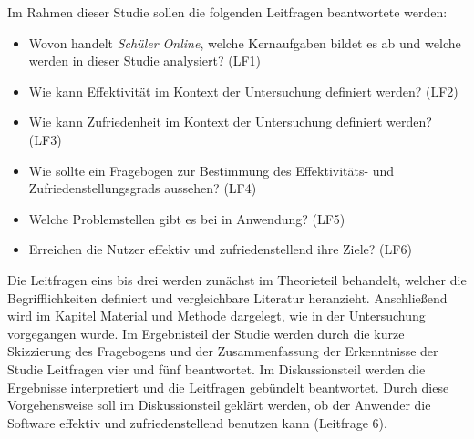 Im Rahmen dieser Studie sollen die folgenden Leitfragen beantwortete werden: 
\begin{itemize}
    \item Wovon handelt \textit{Schüler Online}, welche Kernaufgaben bildet es ab und welche werden in dieser Studie analysiert? (LF1)%
    \item Wie kann Effektivität im Kontext der Untersuchung definiert werden? (LF2)%
    \item Wie kann Zufriedenheit im Kontext der Untersuchung definiert werden? (LF3)%
    \item Wie sollte ein Fragebogen zur Bestimmung des Effektivitäts- und Zufriedenstellungsgrads aussehen? (LF4)%
    \item Welche Problemstellen gibt es bei in Anwendung? (LF5)%
    \item Erreichen die Nutzer effektiv und zufriedenstellend ihre Ziele? (LF6)%
\end{itemize}

Die Leitfragen eins bis drei werden zunächst im Theorieteil behandelt, welcher die Begrifflichkeiten definiert und vergleichbare Literatur heranzieht. Anschließend wird im Kapitel Material und Methode dargelegt, wie in der Untersuchung vorgegangen wurde. Im Ergebnisteil der Studie werden durch die kurze Skizzierung des Fragebogens und der Zusammenfassung der Erkenntnisse der Studie Leitfragen vier und fünf beantwortet. Im Diskussionsteil werden die Ergebnisse interpretiert und die Leitfragen gebündelt beantwortet. Durch diese Vorgehensweise soll im Diskussionsteil geklärt werden, ob der Anwender die Software effektiv und zufriedenstellend benutzen kann (Leitfrage 6).

